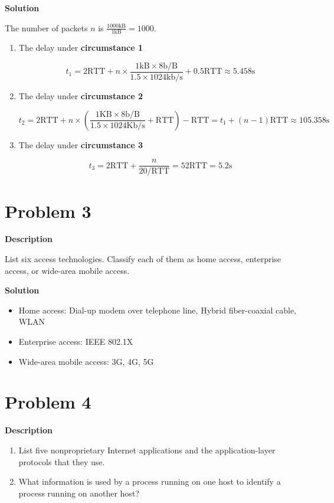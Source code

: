 \documentclass[12pt,letterpaper]{ctexart}
\begin{document}
{\bf Solution}

The number of packets $n$ is $\frac{1000\text{kB}}{1\text{kB}}=1000$.

\begin{enumerate}
  \item The delay under {\bf circumstance 1}

  $$
  t_1 = 2\text{RTT} + n \times \frac{1\text{kB} \times 8\text{b/B}}{1.5\times1024\text{kb/s}} + 0.5\text{RTT} \approx 5.458\text{s}
  $$

  \item The delay under {\bf circumstance 2}

  $$
  t_2 = 2\text{RTT} + n \times (\frac{1\text{KB}\times 8\text{b/B}}{1.5\times1024\text{Kb/s}} + \text{RTT}) - \text{RTT} = t_1 + (n - 1) \text{RTT} \approx 105.358\text{s}
  $$

  \item The delay under {\bf circumstance 3}

  $$
  t_3 = 2\text{RTT} + \frac{n}{20/\text{RTT}} = 52\text{RTT} = 5.2\text{s}
  $$
\end{enumerate}

\section*{Problem 3}

{\bf Description}

List six access technologies. Classify each of them as home access, enterprise access, or wide-area mobile access.

{\bf Solution}

\begin{itemize}
  \item Home access: Dial-up modem over telephone line, Hybrid fiber-coaxial cable, WLAN
  \item Enterprise access: IEEE 802.1X
  \item Wide-area mobile access: 3G, 4G, 5G
\end{itemize}

\section*{Problem 4}
{\bf Description}

\begin{enumerate}
  \item List five nonproprietary Internet applications and the application-layer protocols that they use.
  \item What information is used by a process running on one host to identify a process running on another host?
\end{enumerate}
\end{document}

